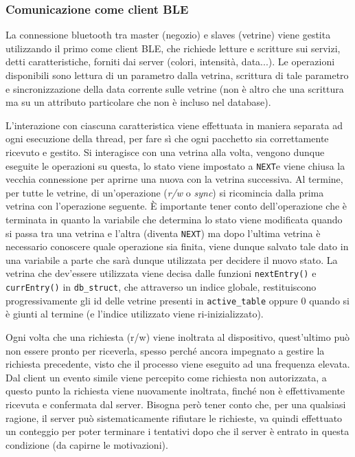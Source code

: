 \subsubsection{Comunicazione come client BLE}


La connessione bluetooth tra master (negozio) e slaves (vetrine) viene gestita utilizzando il primo come client BLE, che richiede letture e scritture sui servizi, detti caratteristiche, forniti dai server (colori, intensit\`a, data...). Le operazioni disponibili sono lettura di un parametro dalla vetrina, scrittura di tale parametro e sincronizzazione della data corrente sulle vetrine (non \`e altro che una scrittura ma su un attributo particolare che non \`e incluso nel database).

L'interazione con ciascuna caratteristica viene effettuata in maniera separata ad ogni esecuzione della thread, per fare s\`i che ogni pacchetto sia correttamente ricevuto e gestito. Si interagisce con una vetrina alla volta, vengono dunque eseguite le operazioni su questa, lo stato viene impostato a \texttt{NEXT}e viene chiusa la vecchia connessione per aprirne una nuova con la vetrina successiva. Al termine, per tutte le vetrine, di un'operazione (\textit{r/w} o \textit{sync}) si ricomincia dalla prima vetrina con l'operazione seguente. \`E importante tener conto dell'operazione che \`e terminata in quanto la variabile che determina lo stato viene modificata quando si passa tra una vetrina e l'altra (diventa \texttt{NEXT}) ma dopo l'ultima vetrina \`e necessario conoscere quale operazione sia finita, viene dunque salvato tale dato in una variabile a parte che sar\`a dunque utilizzata per decidere il nuovo stato. La vetrina che dev'essere utilizzata viene decisa dalle funzioni \texttt{nextEntry()} e \texttt{currEntry()} in \texttt{db\_struct}, che attraverso un indice globale, restituiscono progressivamente gli id delle vetrine presenti in \texttt{active\_table} oppure 0 quando si \`e giunti al termine (e l'indice utilizzato viene ri-inizializzato).

Ogni volta che una richiesta (r/w) viene inoltrata al dispositivo, quest'ultimo pu\`o non essere pronto per riceverla, spesso perch\'e ancora impegnato a gestire la richiesta precedente, visto che il processo viene eseguito ad una frequenza elevata. Dal client un evento simile viene percepito come richiesta non autorizzata, a questo punto la richiesta viene nuovamente inoltrata, finch\'e non \`e effettivamente ricevuta e confermata dal server. Bisogna per\`o tener conto che, per una qualsiasi ragione, il server pu\`o sistematicamente rifiutare le richieste, va quindi effettuato un conteggio per poter terminare i tentativi dopo che il server \`e entrato in questa condizione (da capirne le motivazioni).

